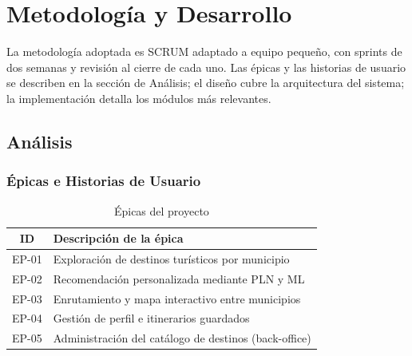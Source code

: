 \documentclass[12pt,letterpaper]{report}
\begin{document}
\chapter{Metodología y Desarrollo}

La metodología adoptada es SCRUM adaptado a equipo pequeño, con sprints de dos semanas y
revisión al cierre de cada uno. Las épicas y las historias de usuario se describen en la
sección de Análisis; el diseño cubre la arquitectura del sistema; la implementación detalla
los módulos más relevantes.

\section{Análisis}

\subsection{Épicas e Historias de Usuario}

\begin{table}[H]
\centering
\caption{Épicas del proyecto}
\label{tab:epicas}
\begin{tabular}{cl}
\toprule
\textbf{ID} & \textbf{Descripción de la épica} \\
\midrule
EP-01 & Exploración de destinos turísticos por municipio \\
EP-02 & Recomendación personalizada mediante PLN y ML \\
EP-03 & Enrutamiento y mapa interactivo entre municipios \\
EP-04 & Gestión de perfil e itinerarios guardados \\
EP-05 & Administración del catálogo de destinos (back-office) \\
\bottomrule
\end{tabular}
\end{table}
\end{document}
